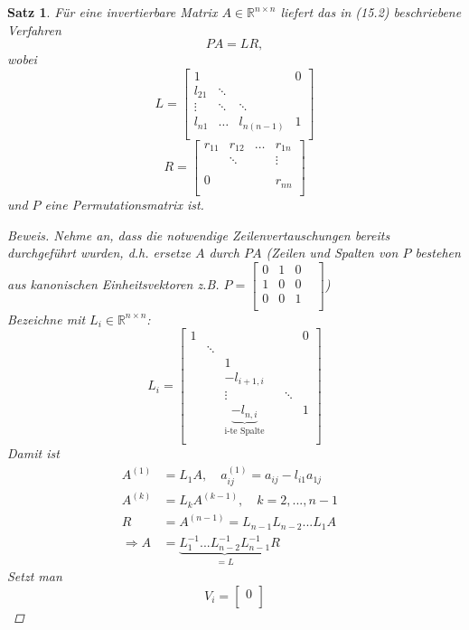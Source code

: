\documentclass[12pt]{article}
\theoremstyle{break}
\newtheorem{theorem}{Satz}[subsection]
\begin{document}
\begin{theorem}
Für eine invertierbare Matrix $A \in \mathbb{R}^{n\times n}$ liefert das in (15.2) beschriebene Verfahren 
$$PA = LR,$$
wobei 
$$L = 
\begin{bmatrix} 
1 &&& 0 \\
l_{21} & \ddots \\
\vdots &\ddots& \ddots \\
l_{n1} &\dots& l_{n(n-1)}& 1 \\
\end{bmatrix}$$
$$R = 
\begin{bmatrix} 
r_{11} & r_{12} & \dots & r_{1n} \\
& \ddots &  & \vdots \\
\\
0&&& r_{nn} \\
\end{bmatrix}$$
und $P$ eine Permutationsmatrix ist.
\begin{proof}[Beweis]
Nehme an, dass die notwendige Zeilenvertauschungen bereits durchgeführt wurden, d.h. ersetze $A$ durch $PA$ (Zeilen und Spalten von $P$ bestehen aus kanonischen Einheitsvektoren z.B. $ P = \begin{bmatrix} 0&1&0&\\1&0&0&\\0&0&1&\\ \end{bmatrix}$)\\
Bezeichne mit $L_i \in \mathbb{R}^{n\times n}$:
$$L_i = 
\begin{bmatrix}
1 &&&&&0\\
& \ddots \\
&& 1 \\
&& -l_{i+1,i} &  \\
&& \vdots &&\ddots\\
&& \underbrace{-l_{n,i}}_{\text{i-te Spalte}} &&&1 \\
\end{bmatrix}$$
Damit ist
\begin{align*}
A^{(1)} &= L_1 A, \quad a_{ij}^{(1)} = a_{ij} - l_{i1} a_{1j} &\\
A^{(k)} &= L_k A^{(k-1)}, \quad k = 2,...,n-1 &\\
R &= A^{(n-1)} = L_{n-1}L_{n-2} ... L_1 A &\\
\Rightarrow A &= \underbrace{L_1^{-1}...L_{n-2}^{-1}L_{n-1}^{-1}}_{=L} R
\end{align*}
Setzt man 
$$V_i = 
\begin{bmatrix}
0 \\

\end{bmatrix}$$
\end{proof}
\end{theorem}
\end{document}

